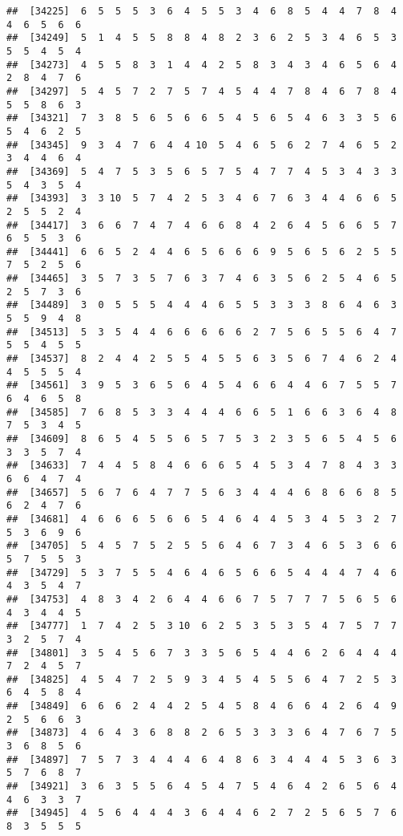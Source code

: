 \documentclass[
]{book}
\begin{document}
\begin{verbatim}
##  [34225]  6  5  5  5  3  6  4  5  5  3  4  6  8  5  4  4  7  8  4  4  6  5  6  6
##  [34249]  5  1  4  5  5  8  8  4  8  2  3  6  2  5  3  4  6  5  3  5  5  4  5  4
##  [34273]  4  5  5  8  3  1  4  4  2  5  8  3  4  3  4  6  5  6  4  2  8  4  7  6
##  [34297]  5  4  5  7  2  7  5  7  4  5  4  4  7  8  4  6  7  8  4  5  5  8  6  3
##  [34321]  7  3  8  5  6  5  6  6  5  4  5  6  5  4  6  3  3  5  6  5  4  6  2  5
##  [34345]  9  3  4  7  6  4  4 10  5  4  6  5  6  2  7  4  6  5  2  3  4  4  6  4
##  [34369]  5  4  7  5  3  5  6  5  7  5  4  7  7  4  5  3  4  3  3  5  4  3  5  4
##  [34393]  3  3 10  5  7  4  2  5  3  4  6  7  6  3  4  4  6  6  5  2  5  5  2  4
##  [34417]  3  6  6  7  4  7  4  6  6  8  4  2  6  4  5  6  6  5  7  6  5  5  3  6
##  [34441]  6  6  5  2  4  4  6  5  6  6  6  9  5  6  5  6  2  5  5  7  5  2  5  6
##  [34465]  3  5  7  3  5  7  6  3  7  4  6  3  5  6  2  5  4  6  5  2  5  7  3  6
##  [34489]  3  0  5  5  5  4  4  4  6  5  5  3  3  3  8  6  4  6  3  5  5  9  4  8
##  [34513]  5  3  5  4  4  6  6  6  6  6  2  7  5  6  5  5  6  4  7  5  5  4  5  5
##  [34537]  8  2  4  4  2  5  5  4  5  5  6  3  5  6  7  4  6  2  4  4  5  5  5  4
##  [34561]  3  9  5  3  6  5  6  4  5  4  6  6  4  4  6  7  5  5  7  6  4  6  5  8
##  [34585]  7  6  8  5  3  3  4  4  4  6  6  5  1  6  6  3  6  4  8  7  5  3  4  5
##  [34609]  8  6  5  4  5  5  6  5  7  5  3  2  3  5  6  5  4  5  6  3  3  5  7  4
##  [34633]  7  4  4  5  8  4  6  6  6  5  4  5  3  4  7  8  4  3  3  6  6  4  7  4
##  [34657]  5  6  7  6  4  7  7  5  6  3  4  4  4  6  8  6  6  8  5  6  2  4  7  6
##  [34681]  4  6  6  6  5  6  6  5  4  6  4  4  5  3  4  5  3  2  7  5  3  6  9  6
##  [34705]  5  4  5  7  5  2  5  5  6  4  6  7  3  4  6  5  3  6  6  5  7  5  5  3
##  [34729]  5  3  7  5  5  4  6  4  6  5  6  6  5  4  4  4  7  4  6  4  3  5  4  7
##  [34753]  4  8  3  4  2  6  4  4  6  6  7  5  7  7  7  5  6  5  6  4  3  4  4  5
##  [34777]  1  7  4  2  5  3 10  6  2  5  3  5  3  5  4  7  5  7  7  3  2  5  7  4
##  [34801]  3  5  4  5  6  7  3  3  5  6  5  4  4  6  2  6  4  4  4  7  2  4  5  7
##  [34825]  4  5  4  7  2  5  9  3  4  5  4  5  5  6  4  7  2  5  3  6  4  5  8  4
##  [34849]  6  6  6  2  4  4  2  5  4  5  8  4  6  6  4  2  6  4  9  2  5  6  6  3
##  [34873]  4  6  4  3  6  8  8  2  6  5  3  3  3  6  4  7  6  7  5  3  6  8  5  6
##  [34897]  7  5  7  3  4  4  4  6  4  8  6  3  4  4  4  5  3  6  3  5  7  6  8  7
##  [34921]  3  6  3  5  5  6  4  5  4  7  5  4  6  4  2  6  5  6  4  4  6  3  3  7
##  [34945]  4  5  6  4  4  4  3  6  4  4  6  2  7  2  5  6  5  7  6  8  3  5  5  5

\end{verbatim}
\end{document}
